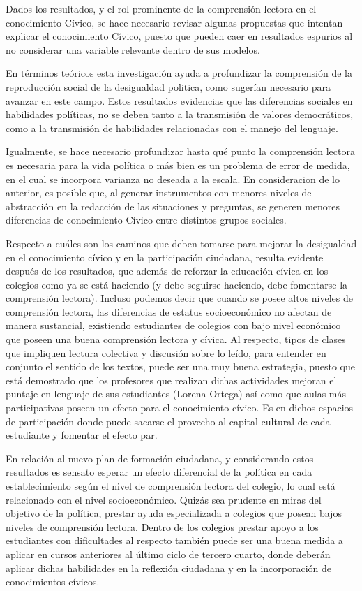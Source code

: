 \documentclass[12pt,twoside]{templates/facsothesis}
\begin{document}
Dados los resultados, y el rol prominente de la comprensión lectora en el conocimiento Cívico, se hace necesario revisar algunas propuestas que intentan explicar el conocimiento Cívico, puesto que pueden caer en resultados espurios al no considerar una variable relevante dentro de sus modelos.

En términos teóricos esta investigación ayuda a profundizar la comprensión de la reproducción social de la desigualdad politica, como \citet{brady_Political_2015} sugerían necesario para avanzar en este campo. Estos resultados evidencias que las diferencias sociales en habilidades políticas, no se deben tanto a la transmisión de valores democráticos, como a la transmisión de habilidades relacionadas con el manejo del lenguaje.

Igualmente, se hace necesario profundizar hasta qué punto la comprensión lectora es necesaria para la vida política o más bien es un problema de error de medida, en el cual se incorpora varianza no deseada a la escala. En consideracion de lo anterior, es posible que, al generar instrumentos con menores niveles de abstracción en la redacción de las situaciones y preguntas, se generen menores diferencias de conocimiento Cívico entre distintos grupos sociales.

Respecto a cuáles son los caminos que deben tomarse para mejorar la desigualdad en el conocimiento cívico y en la participación ciudadana, resulta evidente después de los resultados, que además de reforzar la educación cívica en los colegios como ya se está haciendo (y debe seguirse haciendo, debe fomentarse la comprensión lectora). Incluso podemos decir que cuando se posee altos niveles de comprensión lectora, las diferencias de estatus socioeconómico no afectan de manera sustancial, existiendo estudiantes de colegios con bajo nivel económico que poseen una buena comprensión lectora y cívica. Al respecto, tipos de clases que impliquen lectura colectiva y discusión sobre lo leído, para entender en conjunto el sentido de los textos, puede ser una muy buena estrategia, puesto que está demostrado que los profesores que realizan dichas actividades mejoran el puntaje en lenguaje de sus estudiantes (Lorena Ortega) así como que aulas más participativas poseen un efecto para el conocimiento cívico. Es en dichos espacios de participación donde puede sacarse el provecho al capital cultural de cada estudiante y fomentar el efecto par.

En relación al nuevo plan de formación ciudadana, y considerando estos resultados es sensato esperar un efecto diferencial de la política en cada establecimiento según el nivel de comprensión lectora del colegio, lo cual está relacionado con el nivel socioeconómico. Quizás sea prudente en miras del objetivo de la política, prestar ayuda especializada a colegios que posean bajos niveles de comprensión lectora. Dentro de los colegios prestar apoyo a los estudiantes con dificultades al respecto también puede ser una buena medida a aplicar en cursos anteriores al último ciclo de tercero cuarto, donde deberán aplicar dichas habilidades en la reflexión ciudadana y en la incorporación de conocimientos cívicos.
\end{document}
